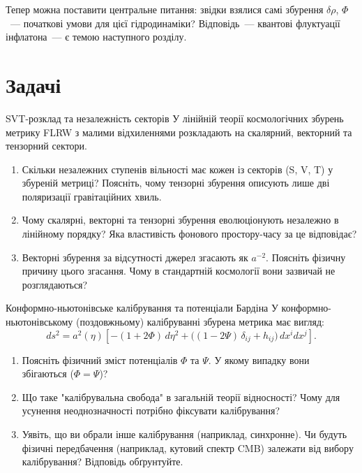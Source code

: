 
Тепер можна поставити центральне питання: звідки взялися
самі збурення $\delta\rho$, $\Phi$~--- початкові умови
для цієї гідродинаміки? Відповідь~--- квантові флуктуації
інфлатона~--- є темою наступного розділу.

\section*{Задачі}



\begin{problem}{SVT-розклад та незалежність секторів}
У лінійній теорії космологічних збурень метрику FLRW з малими відхиленнями
розкладають на скалярний, векторний та тензорний сектори.

\begin{enumerate}
    \item Скільки незалежних ступенів вільності має кожен із секторів
          (S, V, T) у збуреній метриці? Поясніть, чому тензорні збурення
          описують лише дві поляризації гравітаційних хвиль.
    \item Чому скалярні, векторні та тензорні збурення еволюціонують
          незалежно в лінійному порядку? Яка властивість фонового
          простору-часу за це відповідає?
    \item Векторні збурення за відсутності джерел згасають як $a^{-2}$.
          Поясніть фізичну причину цього згасання. Чому в стандартній
          космології вони зазвичай не розглядаються?
\end{enumerate}
\end{problem}


\begin{problem}{Конформно-ньютонівське калібрування та потенціали Бардіна}
У конформно-ньютонівському (поздовжньому) калібруванні збурена метрика має вигляд:
\[
ds^2 = a^2(\eta)\left[-(1 + 2\Phi)\,d\eta^2 + \bigl((1 - 2\Psi)\,\delta_{ij} + h_{ij}\bigr)\,dx^i dx^j\right].
\]

\begin{enumerate}
    \item Поясніть фізичний зміст потенціалів $\Phi$ та $\Psi$.
          У якому випадку вони збігаються ($\Phi = \Psi$)?
    \item Що таке "калібрувальна свобода" в загальній теорії відносності?
          Чому для усунення неоднозначності потрібно фіксувати калібрування?
    \item Уявіть, що ви обрали інше калібрування (наприклад, синхронне).
          Чи будуть фізичні передбачення (наприклад, кутовий спектр CMB)
          залежати від вибору калібрування? Відповідь обґрунтуйте.
\end{enumerate}
\end{problem}

